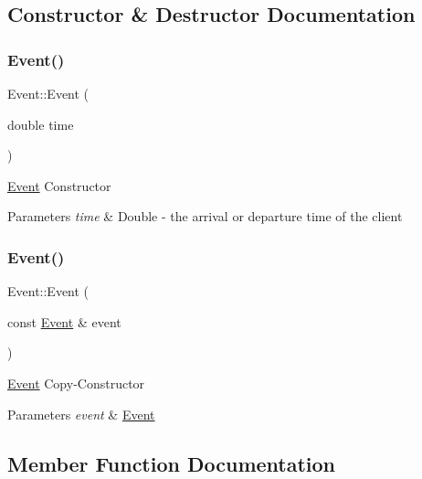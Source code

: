 \subsection{Constructor \& Destructor Documentation}
\mbox{\label{classEvent_aebd4c54256dbf46040053babdfcdf987}} 
\subsubsection{\texorpdfstring{Event()}{Event()}\hspace{0.1cm}{\footnotesize\ttfamily [1/2]}}
{\footnotesize\ttfamily Event\+::\+Event (\begin{DoxyParamCaption}\item[{double}]{time }\end{DoxyParamCaption})\hspace{0.3cm}{\ttfamily [explicit]}}

\hyperlink{classEvent}{Event} Constructor 
\begin{DoxyParams}{Parameters}
{\em time} & Double -\/ the arrival or departure time of the client \\
\hline
\end{DoxyParams}
\mbox{\label{classEvent_ae8b35bf9237b74824194f87128e4fdab}} 
\subsubsection{\texorpdfstring{Event()}{Event()}\hspace{0.1cm}{\footnotesize\ttfamily [2/2]}}
{\footnotesize\ttfamily Event\+::\+Event (\begin{DoxyParamCaption}\item[{const \hyperlink{classEvent}{Event} \&}]{event }\end{DoxyParamCaption})}

\hyperlink{classEvent}{Event} Copy-\/\+Constructor 
\begin{DoxyParams}{Parameters}
{\em event} & \hyperlink{classEvent}{Event} \\
\hline
\end{DoxyParams}


\subsection{Member Function Documentation}
\mbox{\label{classEvent_ab05b23f7cc8d126efcbf189062f3b275}} 
